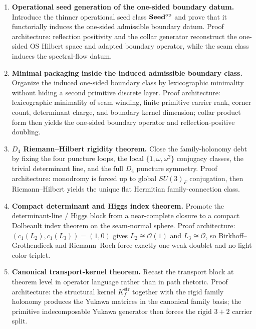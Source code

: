 \begin{tcolorbox}[colback=tfptblue!2, colframe=tfptblue!40, breakable,
    title={Version 4.5 completion surface}, colbacktitle=tfptblue!60]
\begin{enumerate}[leftmargin=1.5em, topsep=3pt, itemsep=4pt]
    \item \textbf{ Operational seed generation of the one-sided boundary datum.} Introduce the thinner operational seed class $\mathbf{Seed}^{\mathrm{op}}$ and prove that it functorially induces the one-sided admissible boundary datum. Proof architecture: reflection positivity and the collar generator reconstruct the one-sided OS Hilbert space and adapted boundary operator, while the seam class induces the spectral-flow datum.
    \item \textbf{ Minimal packaging inside the induced admissible boundary class.} Organize the induced one-sided boundary class by lexicographic minimality without hiding a second primitive discrete layer. Proof architecture: lexicographic minimality of seam winding, finite primitive carrier rank, corner count, determinant charge, and boundary kernel dimension; collar product form then yields the one-sided boundary operator and reflection-positive doubling.
    \item \textbf{ $D_4$ Riemann--Hilbert rigidity theorem.} Close the family-holonomy debt by fixing the four puncture loops, the local $\{1,\omega,\omega^2\}$ conjugacy classes, the trivial determinant line, and the full $D_4$ puncture symmetry. Proof architecture: monodromy is forced up to global $SU(3)_F$ conjugation, then Riemann--Hilbert yields the unique flat Hermitian family-connection class.
    \item \textbf{ Compact determinant and Higgs index theorem.} Promote the determinant-line / Higgs block from a near-complete closure to a compact Dolbeault index theorem on the seam-normal sphere. Proof architecture: $(c_1(L_2),c_1(L_3))=(1,0)$ gives $L_2\cong\mathcal O(1)$ and $L_3\cong\mathcal O$, so Birkhoff--Grothendieck and Riemann--Roch force exactly one weak doublet and no light color triplet.
    \item \textbf{ Canonical transport-kernel theorem.} Recast the transport block at theorem level in operator language rather than in path rhetoric. Proof architecture: the structural kernel $K_f^{\mathrm{str}}$ together with the rigid family holonomy produces the Yukawa matrices in the canonical family basis; the primitive indecomposable Yukawa generator then forces the rigid $3+2$ carrier split.

\end{enumerate}
\end{tcolorbox}
